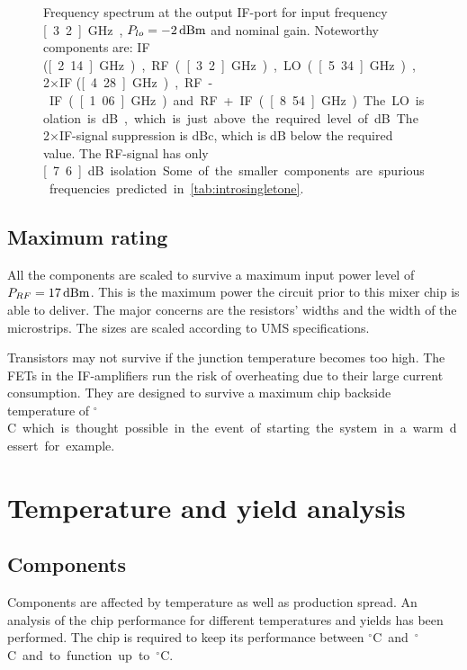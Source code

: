 			\begin{figure}[hbt!]
				\centering
				\caption[IF-port output spectrum.]{Frequency spectrum at the output IF-port for input frequency \unit[3.2]{GHz}, $P_{lo}=\unit[-2]{dBm}$ and nominal gain. Noteworthy components are: IF (\unit[2.14]{GHz}), RF (\unit[3.2]{GHz}), LO (\unit[5.34]{GHz}), 2$\times$IF (\unit[4.28]{GHz}), RF-IF (\unit[1.06]{GHz}) and RF+IF (\unit[8.54]{GHz}). The LO isolation is \unit[21]{dB}, which is just above the required level of \unit[20]{dB}. The 2$\times$IF-signal suppression is \unit[38]{dBc}, which is \unit[2]{dB} below the required value. The RF-signal has only \unit[7.6]{dB} isolation. Some of the smaller components are spurious frequencies predicted in \autoref{tab:introsingletone}.}\label{fig:sysspectrum}
			\end{figure}
			

			
		\subsection{Maximum rating}
			All the components are scaled to survive a maximum input power level of $P_{RF}=\unit[17]{dBm}$. This is the maximum power the circuit prior to this mixer chip is able to deliver. The major concerns are the resistors' widths and the width of the microstrips. The sizes are scaled according to UMS specifications.\autocite{pph25manual}
			
			Transistors may not survive if the junction temperature becomes too high. The FETs in the IF-amplifiers run the risk of overheating due to their large current consumption. They are designed to survive a maximum chip backside temperature of \unit[100]{$^\circ$C} which is thought possible in the event of starting the system in a warm dessert for example.
			
	
	\section{Temperature and yield analysis}	
		\subsection{Components}
			Components are affected by temperature as well as production spread. An analysis of the chip performance for different temperatures and yields has been performed. The chip is required to keep its performance between \unit[-40]{$^\circ$C} and \unit[55]{$^\circ$C} and to function up to \unit[85]{$^\circ$C}. 			
			
